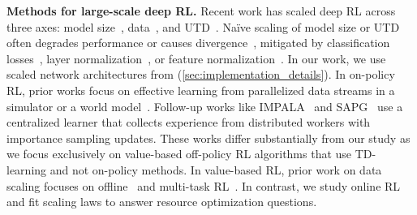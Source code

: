 \textbf{Methods for large-scale deep RL.} Recent work has scaled deep RL across three axes: model size~\citep{kumar2023offline, schwarzer2023bigger, nauman2024bigger}, data~\citep{kumar2023offline, gallici2024simplifying, singla2024sapg}, and UTD~\citep{chen2020randomized, doro2022sample}. Na\"ive scaling of model size or UTD often degrades performance or causes divergence~\citep{nikishin2022primacy, schwarzer2023bigger}, mitigated by classification losses~\citep{kumar2023offline}, layer normalization~\citep{Nauman2024overestimation}, or feature normalization~\citep{kumar2021dr3}. In our work, we use scaled network architectures from \citet{nauman2024bigger} (\cref{sec:implementation_details}). In on-policy RL, prior works focus on effective learning from parallelized data streams in a simulator or a world model~\citep{mnih2016asynchronous, silver2016mastering, schrittwieser2020mastering}. Follow-up works like IMPALA~\citep{espeholt2018impala} and SAPG~\citep{singla2024sapg} use a centralized learner that collects experience from distributed workers with importance sampling updates. These works differ substantially from our study as we focus exclusively on value-based off-policy RL algorithms that use TD-learning and not on-policy methods. In value-based RL, prior work on data scaling focuses on offline~\citep{yu2022leverage, kumar2023offline, park2024value} and multi-task RL~\citep{hafner2023mastering}. In contrast, we study online RL and fit scaling laws to answer resource optimization questions. 


\vspace{-0.2cm}
